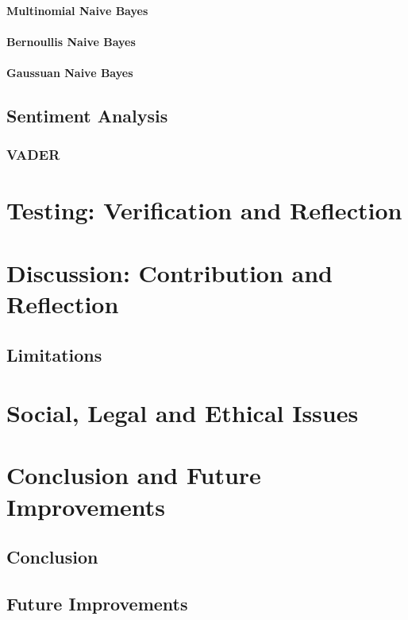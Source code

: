 \documentclass[oneside, 10pt]{article}
\begin{document}
				\paragraph{Multinomial Naive Bayes}
				\paragraph{Bernoullis Naive Bayes}
				\paragraph{Gaussuan Naive Bayes}
		
		\subsection{Sentiment Analysis}
			\subsubsection{VADER}
			
	\newpage
	
	\section{Testing: Verification and Reflection}
	
	\newpage
	
	\section{Discussion: Contribution and Reflection}
	\subsection{Limitations}
	
	\newpage
	
	\section{Social, Legal and Ethical Issues}
	
	\newpage
	
	\section{Conclusion and Future Improvements}
		\subsection{Conclusion}
		\subsection{Future Improvements}
		
\end{document}

